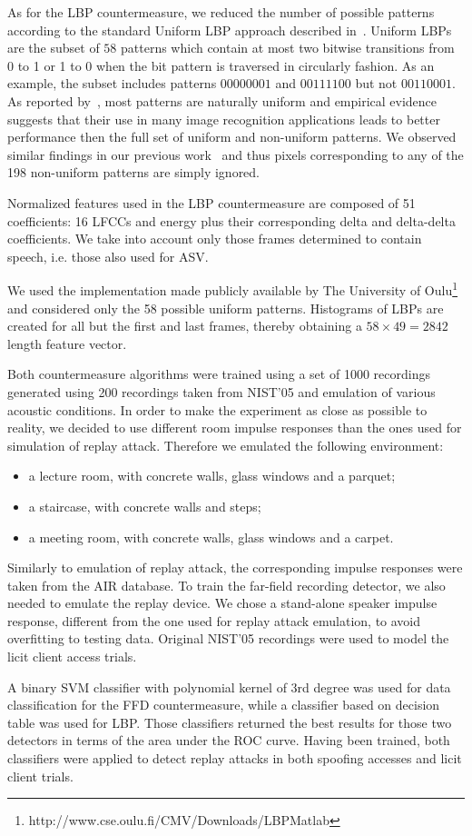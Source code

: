 As for the LBP countermeasure, we reduced the number of possible patterns according to the standard Uniform LBP approach described in~\cite{Ojala2002}.  Uniform LBPs are the subset of $58$ patterns which contain at most two bitwise transitions from 0 to 1 or 1 to 0 when the bit pattern is traversed in circularly fashion.  As an example, the subset includes patterns $00000001$ and $00111100$ but not $00110001$.  As reported by~\cite{Ojala2002}, most patterns are naturally uniform and empirical evidence suggests that their use in many image recognition applications leads to better performance then the full set of uniform and non-uniform patterns.  We observed similar findings in our previous work~\cite{Alegre2013a} and thus pixels corresponding to any of the 198 non-uniform patterns are simply ignored.

Normalized features used in the LBP countermeasure are composed of 51 coefficients: 16 LFCCs and energy plus their corresponding delta and delta-delta coefficients. We take into account only those frames determined to contain speech, i.e. those also used for ASV.  

We used the implementation made publicly available by The University of Oulu\footnote{http://www.cse.oulu.fi/CMV/Downloads/LBPMatlab} and considered only the 58 possible uniform patterns.  Histograms of LBPs are created for all but the first and last frames, thereby obtaining a $58 \times 49 = 2842$ length feature vector.

Both countermeasure algorithms were trained using a set of 1000 recordings generated using 200 recordings taken from NIST'05 and emulation of various acoustic conditions. In order to make the experiment as close as possible to reality, we decided to use different room impulse responses than the ones used for simulation of replay attack. Therefore we emulated the following environment:
\begin{itemize}
\item a lecture room, with concrete walls, glass windows and a parquet;
\item a staircase, with concrete walls and steps;
\item a meeting room, with concrete walls, glass windows and a carpet.
\end{itemize}

Similarly to emulation of replay attack, the corresponding impulse responses were taken from the AIR database. To train the far-field recording detector, we also needed to emulate the replay device. We chose a stand-alone speaker impulse response, different from the one used for replay attack emulation, to avoid overfitting to testing data. Original NIST'05 recordings were used to model the licit client access trials.

A binary SVM classifier with polynomial kernel of 3rd degree was used for data classification for the FFD countermeasure, while a classifier based on decision table was used for LBP. Those classifiers returned the best results for those two detectors in terms of the area under the ROC curve. Having been trained, both classifiers were applied to detect replay attacks in both spoofing accesses and licit client trials.
